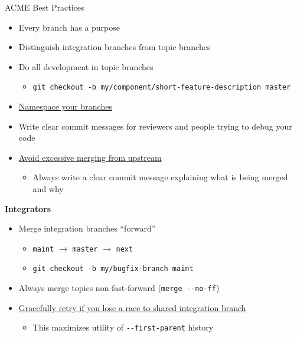 \documentclass{beamer}
\begin{document}
\begin{frame}{ACME Best Practices}
  \begin{itemize}
  \item Every branch has a purpose
  \item Distinguish integration branches from topic branches
  \item Do all development in topic branches
    \begin{itemize}
    \item \texttt{git checkout -b my/component/short-feature-description master}
    \end{itemize}
  \item \href{https://acme-climate.atlassian.net/wiki/display/Docs/Branch\%2C+Tag\%2C+and+Version+name+conventions}{Namespace your branches}
  \item Write clear commit messages for reviewers and people trying to debug your code
  \item \href{https://bitbucket.org/petsc/petsc/wiki/developer-instructions-git\#markdown-header-merging}{Avoid excessive merging from upstream}
    \begin{itemize}
    \item Always write a clear commit message explaining what is being merged and why
    \end{itemize}
  \end{itemize}
  {\bf Integrators}
  \begin{itemize}
  \item Merge integration branches ``forward''
    \begin{itemize}
    \item \texttt{maint} $\to$ \texttt{master} $\to$ \texttt{next}
    \item \texttt{git checkout -b my/bugfix-branch maint}
    \end{itemize}
  \item Always merge topics non-fast-forward (\texttt{merge -{}-no-ff})
  \item \href{https://bitbucket.org/petsc/petsc/wiki/developer-instructions-git\#markdown-header-racy-integration}{Gracefully retry if you lose a race to shared integration branch}
    \begin{itemize}
    \item This maximizes utility of \texttt{-{}-first-parent} history
    \end{itemize}
  \end{itemize}
\end{frame}
\end{document}
